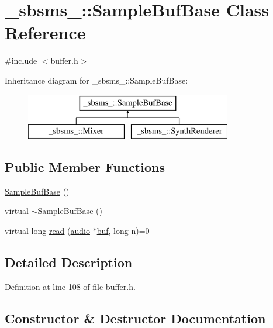 \hypertarget{class__sbsms___1_1_sample_buf_base}{}\section{\+\_\+sbsms\+\_\+\+:\+:Sample\+Buf\+Base Class Reference}
\label{class__sbsms___1_1_sample_buf_base}


{\ttfamily \#include $<$buffer.\+h$>$}

Inheritance diagram for \+\_\+sbsms\+\_\+\+:\+:Sample\+Buf\+Base\+:\begin{figure}[H]
\begin{center}
\leavevmode
\includegraphics[height=2.000000cm]{class__sbsms___1_1_sample_buf_base}
\end{center}
\end{figure}
\subsection*{Public Member Functions}
\begin{DoxyCompactItemize}
\item 
\hyperlink{class__sbsms___1_1_sample_buf_base_a7fb34f1c7bdda0ae33c2e5f8a1a91394}{Sample\+Buf\+Base} ()
\item 
virtual \hyperlink{class__sbsms___1_1_sample_buf_base_a9bd27595ebba3ec6d28069764d691c95}{$\sim$\+Sample\+Buf\+Base} ()
\item 
virtual long \hyperlink{class__sbsms___1_1_sample_buf_base_a9074ff7be98e779b0340ca90950203c8}{read} (\hyperlink{namespace__sbsms___a11786cc5bd221ff534972ae350477324}{audio} $\ast$\hyperlink{xlstr_8c_a781718f5b53a876fe91c424c4607fa8f}{buf}, long n)=0
\end{DoxyCompactItemize}


\subsection{Detailed Description}


Definition at line 108 of file buffer.\+h.



\subsection{Constructor \& Destructor Documentation}
